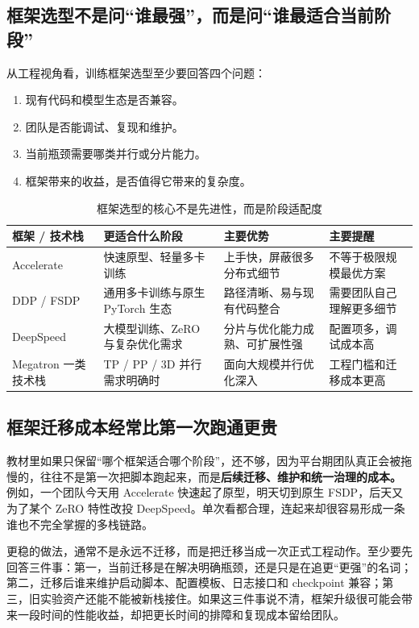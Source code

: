 \subsection{框架选型不是问“谁最强”，而是问“谁最适合当前阶段”}
从工程视角看，训练框架选型至少要回答四个问题：
\begin{enumerate}
  \item 现有代码和模型生态是否兼容。
  \item 团队是否能调试、复现和维护。
  \item 当前瓶颈需要哪类并行或分片能力。
  \item 框架带来的收益，是否值得它带来的复杂度。
\end{enumerate}

\begin{table}[H]
\centering
\small
\begin{tabularx}{\textwidth}{>{\raggedright\arraybackslash}p{2.6cm}>{\raggedright\arraybackslash}p{3.1cm}>{\raggedright\arraybackslash}p{2.8cm}>{\raggedright\arraybackslash}X}
\toprule
\textbf{框架 / 技术栈} & \textbf{更适合什么阶段} & \textbf{主要优势} & \textbf{主要提醒} \\
\midrule
Accelerate & 快速原型、轻量多卡训练 & 上手快，屏蔽很多分布式细节 & 不等于极限规模最优方案 \\
DDP / FSDP & 通用多卡训练与原生 PyTorch 生态 & 路径清晰、易与现有代码整合 & 需要团队自己理解更多细节 \\
DeepSpeed & 大模型训练、ZeRO 与复杂优化需求 & 分片与优化能力成熟、可扩展性强 & 配置项多，调试成本高 \\
Megatron 一类技术栈 & TP / PP / 3D 并行需求明确时 & 面向大规模并行优化深入 & 工程门槛和迁移成本更高 \\
\bottomrule
\end{tabularx}
\caption{框架选型的核心不是先进性，而是阶段适配度}
\label{tab:framework-selection}
\end{table}

\subsection{框架迁移成本经常比第一次跑通更贵}
教材里如果只保留“哪个框架适合哪个阶段”，还不够，因为平台期团队真正会被拖慢的，往往不是第一次把脚本跑起来，而是\textbf{后续迁移、维护和统一治理的成本。} 例如，一个团队今天用 Accelerate 快速起了原型，明天切到原生 FSDP，后天又为了某个 ZeRO 特性改投 DeepSpeed。单次看都合理，连起来却很容易形成一条谁也不完全掌握的多栈链路。

更稳的做法，通常不是永远不迁移，而是把迁移当成一次正式工程动作。至少要先回答三件事：第一，当前迁移是在解决明确瓶颈，还是只是在追更“更强”的名词；第二，迁移后谁来维护启动脚本、配置模板、日志接口和 checkpoint 兼容；第三，旧实验资产还能不能被新栈接住。如果这三件事说不清，框架升级很可能会带来一段时间的性能收益，却把更长时间的排障和复现成本留给团队。

